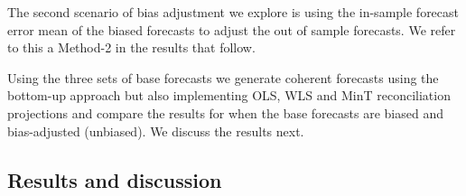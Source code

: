 \documentclass[12pt]{article}
\theoremstyle{definition}
\theoremstyle{property}
\begin{document}
The second scenario of bias adjustment we explore is using the in-sample forecast error mean of the biased forecasts to adjust the out of sample forecasts. We refer to this a Method-2 in the results that follow.
	
Using the three sets of base forecasts we generate coherent forecasts using the bottom-up approach but also implementing OLS, WLS and MinT reconciliation projections and compare the results for when the base forecasts are biased and bias-adjusted (unbiased). We discuss the results next.

\subsection{Results and discussion}



\begin{table}
	\caption {Average {MSE($\times 10^3$)} of base and reconciled $1$-step-ahead point forecasts are presented for log transformation and Box-Cox transformation. Unbiased(Method-1) follows from the bias adjustment via Taylor's de-biasing factor whereas Unbiased(Method-2) follows from residual mean adjustment.}
	\label{tab:Results_MSE}
	\centering
	
\end{table}
\end{document}
